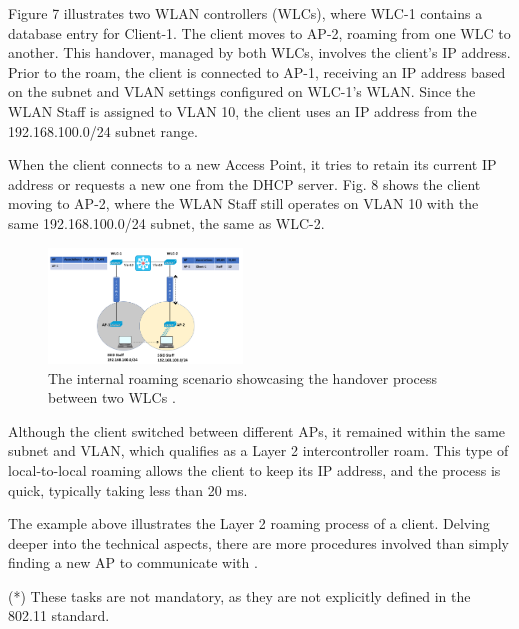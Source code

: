 \documentclass[conference]{IEEEtran}
\begin{document}
Figure 7 illustrates two WLAN controllers (WLCs), where WLC-1 contains a database entry for Client-1. The client moves to AP-2, roaming from one WLC to another. This handover, managed by both WLCs, involves the client’s IP address. Prior to the roam, the client is connected to AP-1, receiving an IP address based on the subnet and VLAN settings configured on WLC-1’s WLAN. Since the WLAN Staff is assigned to VLAN 10, the client uses an IP address from the 192.168.100.0/24 subnet range.

When the client connects to a new Access Point, it tries to retain its current IP address or requests a new one from the DHCP server. Fig. 8 shows the client moving to AP-2, where the WLAN Staff still operates on VLAN 10 with the same 192.168.100.0/24 subnet, the same as WLC-2.

\begin{figure}[htbp]
    \centering
    \includegraphics[width=0.46\textwidth]{fig8_internal_roaming_after_roaming.png}
    \caption{The internal roaming scenario showcasing the handover process between two WLCs \cite{study_ccnp}.}
\end{figure}

Although the client switched between different APs, it remained within the same subnet and VLAN, which qualifies as a Layer 2 intercontroller roam. This type of local-to-local roaming allows the client to keep its IP address, and the process is quick, typically taking less than 20 ms.

The example above illustrates the Layer 2 roaming process of a client. Delving deeper into the technical aspects, there are more procedures involved than simply finding a new AP to communicate with \cite{wlan_fundamentals}. 

(*) These tasks are not mandatory, as they are not explicitly defined in the 802.11 standard.
\end{document}
